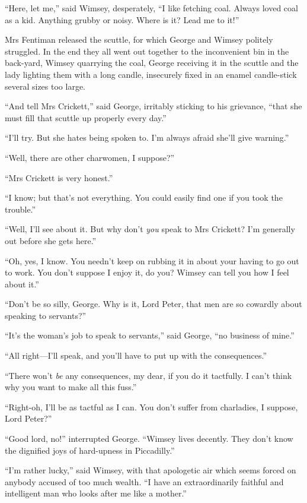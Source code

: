 \enquote{Here, let me,} said Wimsey, desperately, \enquote{I like fetching coal. Always loved coal as a kid. Anything grubby or noisy. Where is it? Lead me to it!}

Mrs Fentiman released the scuttle, for which George and Wimsey politely struggled. In the end they all went out together to the inconvenient bin in the back-yard, Wimsey quarrying the coal, George receiving it in the scuttle and the lady lighting them with a long candle, insecurely fixed in an enamel candle-stick several sizes too large.

\enquote{And tell Mrs Crickett,} said George, irritably sticking to his grievance, \enquote{that she must fill that scuttle up properly every day.}

\enquote{I'll try. But she hates being spoken to. I'm always afraid she'll give warning.}

\enquote{Well, there are other charwomen, I suppose?}

\enquote{Mrs Crickett is very honest.}

\enquote{I know; but that's not everything. You could easily find one if you took the trouble.}

\enquote{Well, I'll see about it. But why don't \textit{you} speak to Mrs Crickett? I'm generally out before she gets here.}

\enquote{Oh, yes, I know. You needn't keep on rubbing it in about your having to go out to work. You don't suppose I enjoy it, do you? Wimsey can tell you how I feel about it.}

\enquote{Don't be so silly, George. Why is it, Lord Peter, that men are so cowardly about speaking to servants?}

\enquote{It's the woman's job to speak to servants,} said George, \enquote{no business of mine.}

\enquote{All right\allowbreak---\allowbreak I'll speak, and you'll have to put up with the consequences.}

\enquote{There won't \textit{be} any consequences, my dear, if you do it tactfully. I can't think why you want to make all this fuss.}

\enquote{Right-oh, I'll be as tactful as I can. You don't suffer from charladies, I suppose, Lord Peter?}

\enquote{Good lord, no!} interrupted George. \enquote{Wimsey lives decently. They don't know the dignified joys of hard-upness in Piccadilly.}

\enquote{I'm rather lucky,} said Wimsey, with that apologetic air which seems forced on anybody accused of too much wealth. \enquote{I have an extraordinarily faithful and intelligent man who looks after me like a mother.}

